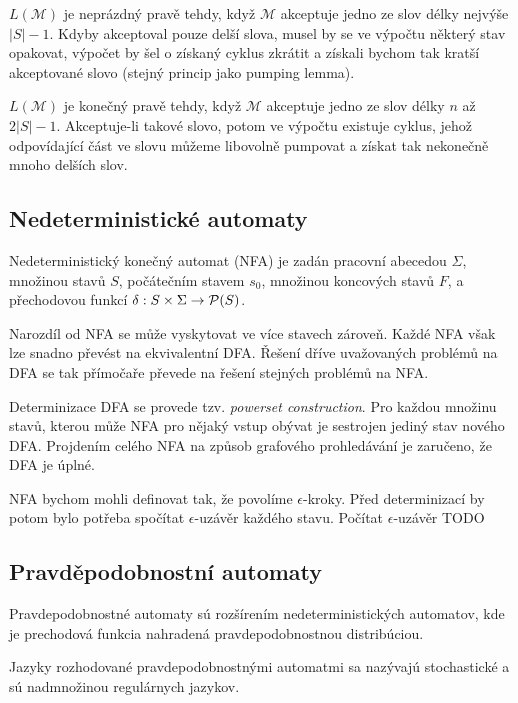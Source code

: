 $L(\mathcal{M})$ je neprázdný pravě tehdy, když $\mathcal{M}$
akceptuje jedno ze slov délky nejvýše $\lvert S \rvert -1$.
Kdyby akceptoval pouze delší slova, musel by se ve výpočtu některý stav
opakovat, výpočet by šel o získaný cyklus zkrátit a získali bychom tak
kratší akceptované slovo (stejný princip jako pumping lemma).

$L(\mathcal{M})$ je konečný pravě tehdy, když $\mathcal{M}$
akceptuje jedno ze slov délky $n$ až $2 \lvert S \rvert - 1$.
Akceptuje-li takové slovo, potom ve výpočtu existuje cyklus, jehož
odpovídající část ve slovu můžeme libovolně pumpovat a získat tak
nekonečně mnoho delších slov.

\subsection{Nedeterministické automaty}

\begin{definition}
    Nedeterministický konečný automat (NFA) je zadán
    pracovní abecedou $\Sigma$,
    množinou stavů $S$,
    počátečním stavem $s_0$,
    množinou koncových stavů $F$,
    a přechodovou funkcí $\delta : S \times \Sigma \to \mathcal{P}(S)$.
\end{definition}

Narozdíl od NFA se může vyskytovat ve více stavech zároveň. Každé NFA
však lze snadno převést na ekvivalentní DFA. Řešení dříve uvažovaných
problémů na DFA se tak přímočaře převede na řešení stejných problémů na
NFA.

Determinizace DFA se provede tzv. {\em powerset construction}. Pro
každou množinu stavů, kterou může NFA pro nějaký vstup obývat je
sestrojen jediný stav nového DFA. Projdením celého NFA na způsob
grafového prohledávání je zaručeno, že DFA je úplné.

NFA bychom mohli definovat tak, že povolíme $\epsilon$-kroky. Před
determinizací by potom bylo potřeba spočítat $\epsilon$-uzávěr každého
stavu. Počítat $\epsilon$-uzávěr TODO

\subsection{Pravděpodobnostní automaty}

Pravdepodobnostné automaty sú rozšírením nedeterministických
automatov, kde je prechodová funkcia nahradená pravdepodobnostnou
distribúciou.

Jazyky rozhodované pravdepodobnostnými automatmi sa nazývajú stochastické
a sú nadmnožinou regulárnych jazykov.

